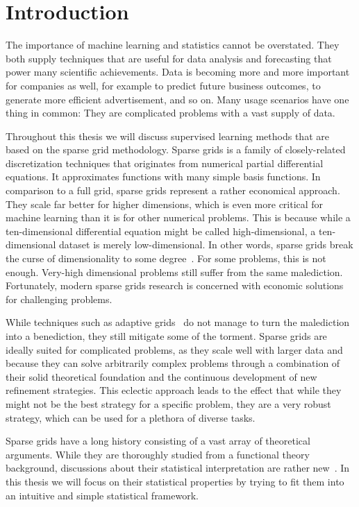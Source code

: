 \chapter{Introduction}\label{chapter:introduction}
The importance of machine learning and statistics cannot be overstated.
They both supply techniques that are useful for data analysis and forecasting that power many scientific achievements.
Data is becoming more and more important for companies as well, for example to predict future business outcomes, to generate more efficient advertisement, and
so on.
Many usage scenarios have one thing in common:
They are complicated problems with a vast supply of data.

Throughout this thesis we will discuss supervised learning methods that are based on the sparse grid methodology.
Sparse grids is a family of closely-related discretization techniques that originates from numerical partial differential equations.
It approximates functions with many simple basis functions.
In comparison to a full grid, sparse grids represent a rather economical
approach.
They scale far better for higher dimensions, which is even more critical for machine
learning than it is for other numerical problems.
This is because while a ten-dimensional differential equation might be called high-dimensional,
a ten-dimensional dataset is merely low-dimensional.
In other words, sparse grids break the curse of dimensionality to some degree~\cite{bungartzSparse}.
For some problems, this is not enough.
Very-high dimensional problems still suffer from the same malediction.
Fortunately, modern sparse grids research is concerned with economic solutions for
challenging problems.

While techniques such as adaptive grids~\cite{spatAdaptGrid} do not manage to
turn the malediction into a benediction, they still mitigate some of the torment.
Sparse grids are ideally suited for complicated problems, as they scale well with
larger data and because they can solve arbitrarily complex problems through
a combination of their solid theoretical foundation and the continuous development of new refinement strategies.
This eclectic approach leads to the effect that while they might not be the best strategy for a
specific problem, they are a very robust strategy, which can be used for a
plethora of diverse tasks.

Sparse grids have a long history consisting of a vast array of theoretical arguments.
While they are thoroughly studied from a functional theory background, discussions about their statistical interpretation are rather new~\cite{sparse-parsimony}.
In this thesis we will focus on their statistical properties by trying to fit them into an intuitive and simple statistical framework.

